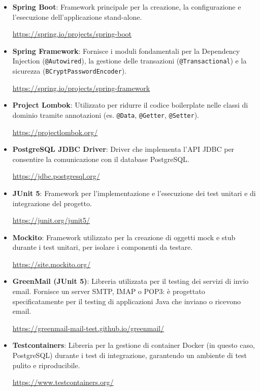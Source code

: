 \documentclass[
  italian,
  paper=a4,
  ,captions=tableheading
]{scrbook}
\newcommand{\passthrough}[1]{#1}
\begin{document}
\begin{itemize}
\item
  \textbf{Spring Boot}: Framework principale per la creazione, la
  configurazione e l'esecuzione dell'applicazione stand-alone.

  \url{https://spring.io/projects/spring-boot}
\item
  \textbf{Spring Framework}: Fornisce i moduli fondamentali per la
  Dependency Injection (\passthrough{\lstinline!@Autowired!}), la
  gestione delle transazioni (\passthrough{\lstinline!@Transactional!})
  e la sicurezza (\passthrough{\lstinline!BCryptPasswordEncoder!}).

  \url{https://spring.io/projects/spring-framework}
\item
  \textbf{Project Lombok}: Utilizzato per ridurre il codice boilerplate
  nelle classi di dominio tramite annotazioni (es.
  \passthrough{\lstinline!@Data!}, \passthrough{\lstinline!@Getter!},
  \passthrough{\lstinline!@Setter!}).

  \url{https://projectlombok.org/}
\item
  \textbf{PostgreSQL JDBC Driver}: Driver che implementa l'API JDBC per
  consentire la comunicazione con il database PostgreSQL.

  \url{https://jdbc.postgresql.org/}
\item
  \textbf{JUnit 5}: Framework per l'implementazione e l'esecuzione dei
  test unitari e di integrazione del progetto.

  \url{https://junit.org/junit5/}
\item
  \textbf{Mockito}: Framework utilizzato per la creazione di oggetti
  mock e stub durante i test unitari, per isolare i componenti da
  testare.

  \url{https://site.mockito.org/}
\item
  \textbf{GreenMail (JUnit 5)}: Libreria utilizzata per il testing dei
  servizi di invio email. Fornisce un server SMTP, IMAP o POP3: è
  progettato specificatamente per il testing di applicazioni Java che
  inviano o ricevono email.

  \url{https://greenmail-mail-test.github.io/greenmail/}
\item
  \textbf{Testcontainers}: Libreria per la gestione di container Docker
  (in questo caso, PostgreSQL) durante i test di integrazione,
  garantendo un ambiente di test pulito e riproducibile.

  \url{https://www.testcontainers.org/}
\end{itemize}
\end{document}
